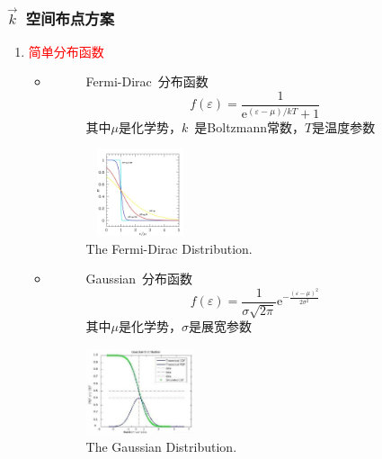 \documentclass[cjk,slidestop,compress,mathserif,blue]{beamer}
\begin{document}
\frame
{
\frametitle{$\vec k$~空间布点方案}
\begin{enumerate}
	\item \textcolor{red}{简单分布函数}\\
		\begin{itemize}
			\item 
				\begin{figure}[h!]
					\begin{minipage}[t]{0.40\linewidth}
						\textrm{Fermi-Dirac~}分布函数$$f(\varepsilon)=\dfrac1{\mathrm{e}^{(\varepsilon-\mu)/kT}+1}$$ 
						其中$\mu$是化学势，$k$~是\textrm{Boltzmann}常数，$T$是温度参数
					\end{minipage}
				\hfill
					\begin{minipage}[t]{0.55\linewidth}
					\centering
					\vspace*{-0.35in}
					\hspace*{-0.5in}
					\includegraphics[height=1.0in,width=1.25in,viewport=0 0 530 500,clip]{Figures/Fermi-Dirac-distribution.jpg}
					\caption{\textrm{The Fermi-Dirac Distribution.}}%
					\label{Fermi-Dirac-distribution}
					\end{minipage}
				\end{figure} 
			\item 
				\begin{figure}[h!]
					\begin{minipage}[t]{0.40\linewidth}
						\textrm{Gaussian~}分布函数$$f(\varepsilon)=\dfrac1{\sigma\sqrt{2\pi}}\mathrm{e}^{-\frac{(\varepsilon-\mu)^2}{2\sigma^2}}$$
						其中$\mu$是化学势，$\sigma$是展宽参数
					\end{minipage}
				\hfill
					\begin{minipage}[t]{0.55\linewidth}
					\centering
					\vspace*{-0.35in}
					\hspace*{-0.5in}
					\includegraphics[height=1.0in,width=1.25in,viewport=0 0 530 500,clip]{Figures/Gaussian-distribution.jpg}
					\caption{\tiny \textrm{The Gaussian Distribution.}}%
					\label{Gaussian-distribution}
					\end{minipage}
				\end{figure} 
		\end{itemize}
\end{enumerate}
}
\end{document}
